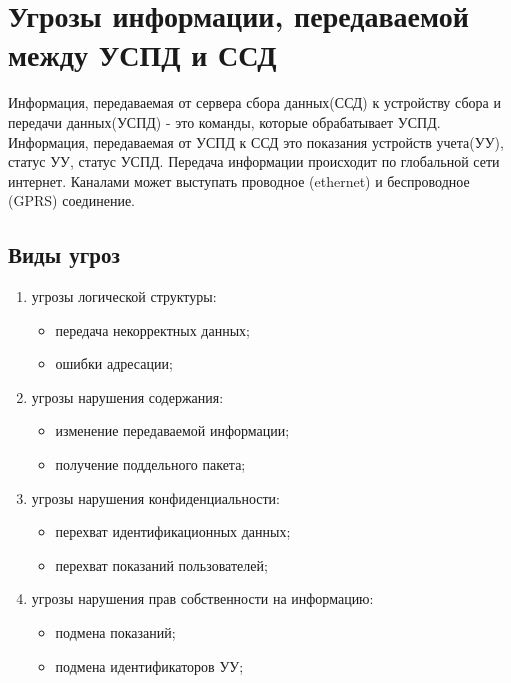 \newpage
\section{Угрозы информации, передаваемой между УСПД и ССД}
\setcounter{figure}{0}

Информация, передаваемая от сервера сбора данных(ССД) к устройству сбора и передачи данных(УСПД) - это команды, которые обрабатывает УСПД. Информация, передаваемая от УСПД к ССД это показания устройств учета(УУ), статус УУ, статус УСПД. Передача информации происходит по глобальной сети интернет. Каналами может выступать проводное (ethernet) и беспроводное (GPRS) соединение.

\subsection{Виды угроз}

\begin{enumerate}

 \item угрозы логической структуры:
 \begin{itemize}
  \item передача некорректных данных;
  \item ошибки адресации;
 \end{itemize}
 
 \item угрозы нарушения содержания:
 \begin{itemize}
  \item изменение передаваемой информации;
  \item получение поддельного пакета;
 \end{itemize}
 
 \item угрозы нарушения конфиденциальности:
 \begin{itemize}
  \item перехват идентификационных данных;
  \item перехват показаний пользователей;
 \end{itemize}
 
 \item угрозы нарушения прав собственности на информацию:
 \begin{itemize}
  \item подмена показаний;
  \item подмена идентификаторов УУ;
 \end{itemize}
 
\end{enumerate}

